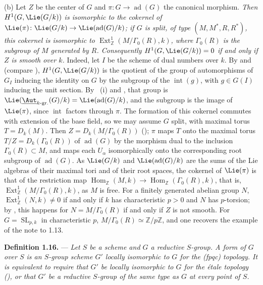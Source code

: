 (b) Let \(Z\) be the center of \(G\) and \(\pi\colon G\to\operatorname{ad}(G)\) the canonical
morphism. \emph{Then \(H^1(G,\Lie(G/k))\) is isomorphic to the cokernel of
\(\Lie(\pi)\colon\Lie(G/k)\to\Lie(\operatorname{ad}(G)/k)\); if \(G\) is split, of type
\((M,M^*,R,R^*)\), this cokernel is isomorphic to
\(\operatorname{Ext}^1_{\mathbb Z}(M/\Gamma_0(R),k)\), where \(\Gamma_0(R)\) is the subgroup of
\(M\) generated by \(R\). Consequently \(H^1(G,\Lie(G/k))=0\) if and only if \(Z\) is smooth over
\(k\).} Indeed, let \(I\) be the scheme of dual numbers over \(k\). By
 and 
(compare ), \(H^1(G,\Lie(G/k))\) is the quotient of the
group of automorphisms of \(G_I\) inducing the identity on \(G\) by the subgroup of the
\(\operatorname{int}(g)\), with \(g\in G(I)\) inducing the unit section. By
~(i) and , that group is
\(\Lie(\underline{\Aut}_{k\text{-}\mathrm{gr.}}(G)/k)=\Lie(\operatorname{ad}(G)/k)\), and the
subgroup is the image of \(\Lie(\pi)\), since \(\operatorname{int}\) factors through \(\pi\).
The formation of this cokernel commutes with extension of the base field, so we may assume \(G\)
split, with maximal torus \(T=D_k(M)\). Then \(Z=D_k(M/\Gamma_0(R))\)
\textup{()}; \(\pi\) maps \(T\) onto the maximal
torus \(T/Z=D_k(\Gamma_0(R))\) of \(\operatorname{ad}(G)\) by the morphism dual to the inclusion
\(\Gamma_0(R)\subset M\), and maps each \(U_\alpha\) isomorphically onto the corresponding root
subgroup of \(\operatorname{ad}(G)\). As \(\Lie(G/k)\) and \(\Lie(\operatorname{ad}(G)/k)\) are the
sums of the Lie algebras of their maximal tori and of their root spaces, the cokernel of
\(\Lie(\pi)\) is that of the restriction map
\(\operatorname{Hom}_{\mathbb Z}(M,k)\to\operatorname{Hom}_{\mathbb Z}(\Gamma_0(R),k)\), that is,
\(\operatorname{Ext}^1_{\mathbb Z}(M/\Gamma_0(R),k)\), as \(M\) is free. For a finitely generated
abelian group \(N\), \(\operatorname{Ext}^1_{\mathbb Z}(N,k)\neq0\) if and only if \(k\) has
characteristic \(p>0\) and \(N\) has \(p\)-torsion; by
, this happens for
\(N=M/\Gamma_0(R)\) if and only if \(Z\) is not smooth. For \(G=\operatorname{SL}_{p,k}\) in
characteristic \(p\), \(M/\Gamma_0(R)\simeq\mathbb Z/p\mathbb Z\), and one recovers the example of
the note to 1.13.


\medskip\noindent\textbf{Definition 1.16.} ---
{\itshape Let \(S\) be a scheme and \(G\) a reductive \(S\)-group. A
\emph{form of \(G\) over \(S\)} is an \(S\)-group scheme \(G'\)
locally isomorphic to \(G\) for the \textup{(fpqc)} topology. It is
equivalent to require that \(G'\) be locally isomorphic to \(G\) for
the étale topology (), or that \(G'\) be a
reductive \(S\)-group of the same type as \(G\) at every point of
\(S\).}


